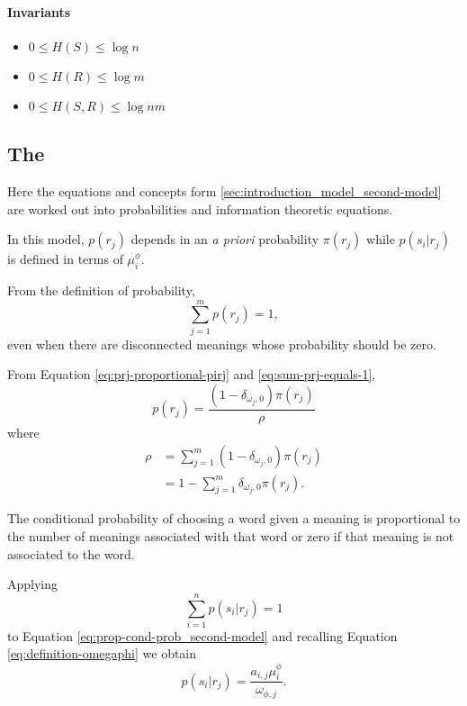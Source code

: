 \paragraph{Invariants}
\begin{itemize}
\item $0 \leq H(S) \leq \log n$
\item $0 \leq H(R) \leq \log m$
\item $0 \leq H(S,R) \leq \log nm$
\end{itemize}

\subsection{The \secondmodel{}}
\label{sec:model_math_second-model}

Here the equations and concepts form \ref{sec:introduction_model_second-model} are worked out into probabilities and information theoretic equations.

In this model, $p(r_j)$ depends in an \emph{a priori} probability $\pi(r_j)$ while $p(s_i | r_j)$ is defined in terms of $\mu_i^\phi.$

From the definition of probability,
\begin{equation}
  \label{eq:sum-prj-equals-1}
  \sum_{j=1}^m p(r_j) = 1,
\end{equation}
even when there are disconnected meanings whose probability should be zero.

From Equation \ref{eq:prj-proportional-pirj} and \ref{eq:sum-prj-equals-1},
\begin{equation}
  \label{eq:definition-prj_second-model}
  p(r_j) = \frac{(1 - \delta_{\omega_j,0}) \pi(r_j)}{\rho}
\end{equation}
where
\begin{align}
  \label{eq:definition-rho}
  \rho &= \sum_{j=1}^m (1 - \delta_{\omega_j,0}) \pi(r_j) \\
       &= 1 - \sum_{j=1}^m \delta_{\omega_j,0} \pi(r_j). \nonumber
\end{align}

The conditional probability of choosing a word given a meaning is proportional to the number of meanings associated with that word or zero if that meaning is not associated to the word.

Applying
\begin{equation*}
  \sum_{i=1}^n p(s_i | r_j) = 1
\end{equation*}
to Equation \eqref{eq:prop-cond-prob_second-model} and recalling Equation \eqref{eq:definition-omegaphi} we obtain
\begin{equation}
  \label{eq:definition-cond-prob_second-model}
  p(s_i | r_j) = \frac{a_{i,j} \mu_i^\phi}{\omega_{\phi,j}}.
\end{equation}

